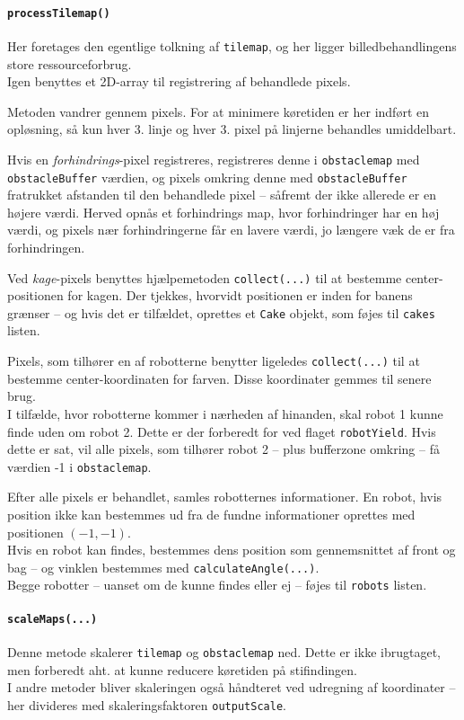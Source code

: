 \paragraph{\texttt{processTilemap()}}
Her foretages den egentlige tolkning af \texttt{tilemap}, og her ligger billedbehandlingens store ressourceforbrug.\\
Igen benyttes et 2D-array til registrering af behandlede pixels.

Metoden vandrer gennem pixels. For at minimere køretiden er her indført en opløsning, så kun hver 3. linje og hver 3. pixel på linjerne behandles umiddelbart.

Hvis en \textit{forhindrings}-pixel registreres, registreres denne i \texttt{obstaclemap} med \texttt{obstacleBuffer} værdien, og pixels omkring denne med \texttt{obstacleBuffer} fratrukket afstanden til den behandlede pixel -- såfremt der ikke allerede er en højere værdi. Herved opnås et forhindrings map, hvor forhindringer har en høj værdi, og pixels nær forhindringerne får en lavere værdi, jo længere væk de er fra forhindringen.

Ved \textit{kage}-pixels benyttes hjælpemetoden \texttt{collect(...)} til at bestemme center-positionen for kagen. Der tjekkes, hvorvidt positionen er inden for banens grænser -- og hvis det er tilfældet, oprettes et \texttt{Cake} objekt, som føjes til \texttt{cakes} listen.

Pixels, som tilhører en af robotterne benytter ligeledes \texttt{collect(...)} til at bestemme center-koordinaten for farven. Disse koordinater gemmes til senere brug.\\
I tilfælde, hvor robotterne kommer i nærheden af hinanden, skal robot 1 kunne finde uden om robot 2. Dette er der forberedt for ved flaget \texttt{robotYield}. Hvis dette er sat, vil alle pixels, som tilhører robot 2 -- plus bufferzone omkring -- få værdien -1 i \texttt{obstaclemap}.

Efter alle pixels er behandlet, samles robotternes informationer. En robot, hvis position ikke kan bestemmes ud fra de fundne informationer oprettes med positionen $(-1,-1)$.\\
Hvis en robot kan findes, bestemmes dens position som gennemsnittet af front og bag -- og vinklen bestemmes med \texttt{calculateAngle(...)}.\\
Begge robotter -- uanset om de kunne findes eller ej -- føjes til \texttt{robots} listen.

\paragraph{\texttt{scaleMaps(...)}}
Denne metode skalerer \texttt{tilemap} og \texttt{obstaclemap} ned. Dette er ikke ibrugtaget, men forberedt aht. at kunne reducere køretiden på stifindingen.\\
I andre metoder bliver skaleringen også håndteret ved udregning af koordinater -- her divideres med skaleringsfaktoren \texttt{outputScale}.

